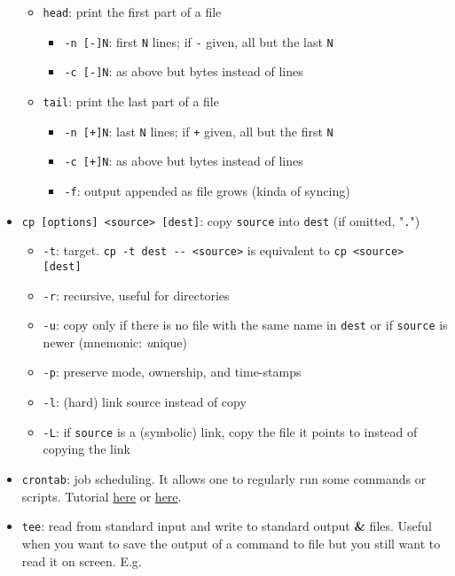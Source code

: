 \documentclass[a4paper,12pt,%
              final%
              ]{article}
\begin{document}
\begin{itemize}
    \begin{itemize}
      \item \texttt{head}: print the first part of a file
        \begin{itemize}
          \item \verb|-n [-]N|: first \texttt{N} lines; if \verb|-| given, all but the last \texttt{N}
          \item \verb|-c [-]N|: as above but bytes instead of lines
        \end{itemize}
      \item \texttt{tail}: print the last part of a file
        \begin{itemize}
          \item \verb|-n [+]N|: last \texttt{N} lines; if \verb|+| given, all but the first \texttt{N}
          \item \verb|-c [+]N|: as above but bytes instead of lines
          \item \verb|-f|: output appended as file grows (kinda of syncing)
        \end{itemize}
    \end{itemize}
  \item \verb|cp [options] <source> [dest]|: copy \texttt{source} into \texttt{dest} (if omitted, "\texttt{.}")
    \begin{itemize}
      \item \verb|-t|: target. \verb|cp -t dest -- <source>| is equivalent to \verb|cp <source> [dest]|
      \item \verb|-r|: recursive, useful for directories
      \item \verb|-u|: copy only if there is no file with the same name in \texttt{dest} or if \texttt{source} is newer (mnemonic: \emph{u}nique)
      \item \verb|-p|: preserve mode, ownership, and time-stamps
      \item \verb|-l|: (hard) link source instead of copy
      \item \verb|-L|: if \texttt{source} is a (symbolic) link, copy the file it points to instead of copying the link
    \end{itemize}
  \item \verb|crontab|: job scheduling. It allows one to regularly run some commands or scripts. Tutorial \href{https://www.adminschoice.com/crontab-quick-reference}{here} or \href{https://www.computerhope.com/unix/ucrontab.htm}{here}.
  \item \texttt{tee}: read from standard input and write to standard output \textbf{\&} files. Useful when you want to save the output of a command to file but you still want to read it on screen. E.g.

\end{itemize}
\end{document}
